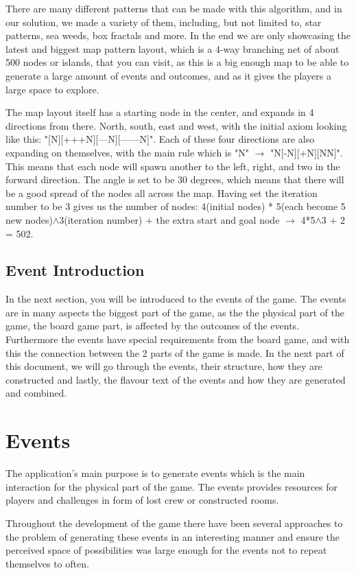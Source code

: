 There are many different patterns that can be made with this algorithm, and in our solution, we made a variety of them, including, but not limited to, star patterns, sea weeds, box fractals and more. 
In the end we are only showcasing the latest and biggest map pattern layout, which is a 4-way branching net of about 500 nodes or islands, that you can visit, as this is a big enough map to be able to generate a large amount of events and outcomes, and as it gives the players a large space to explore.

The map layout itself has a starting node in the center, and expands in 4 directions from there. North, south, east and west, with the initial axiom looking like this: "[N][+++N][---N][------N]". Each of these four directions are also expanding on themselves, with the main rule which is "N" $\rightarrow$ "N[-N][+N][NN]". This means that each node will spawn another to the left, right, and two in the forward direction. The angle is set to be 30 degrees, which means that there will be a good spread of the nodes all across the map. Having set the iteration number to be 3 gives us the number of nodes: 4(initial nodes) * 5(each become 5 new nodes)$\wedge$3(iteration number) + the extra start and goal node $\rightarrow$ 4*5$\wedge$3 + 2 = 502.

\subsection{Event Introduction}
In the next section, you will be introduced to the events of the game. The events are in many aspects the biggest part of the game, as the the physical part of the game, the board game part, is affected by the outcomes of the events. Furthermore the events have special requirements from the board game, and with this the connection between the 2 parts of the game is made.
In the next part of this document, we will go through the events, their structure, how they are constructed and lastly, the flavour text of the events and how they are generated and combined.

\section{Events}
\label{sec:eve}
The application's main purpose is to generate events which is the main interaction for the physical part of the game. The events provides resources for players and challenges in form of lost crew or constructed rooms.

Throughout the development of the game there have been several approaches to the problem of generating these events in an interesting manner and ensure the perceived space of possibilities was large enough for the events not to repeat themselves to often.

